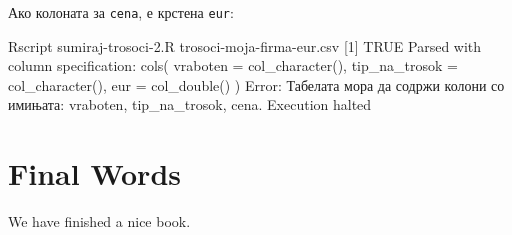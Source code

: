 \documentclass[
]{book}
\newenvironment{Shaded}{\begin{snugshade}}{\end{snugshade}}
\newcommand{\ExtensionTok}[1]{#1}
\newcommand{\NormalTok}[1]{#1}
\newcommand{\StringTok}[1]{\textcolor[rgb]{0.31,0.60,0.02}{#1}}
\begin{document}
Ако колоната за \texttt{cena}, е крстена \texttt{eur}:

\begin{Shaded}
\begin{Highlighting}[]
\ExtensionTok{Rscript}\NormalTok{ sumiraj{-}trosoci{-}2.R trosoci{-}moja{-}firma{-}eur.csv}
\NormalTok{[}\ExtensionTok{1}\NormalTok{] TRUE}
\ExtensionTok{Parsed}\NormalTok{ with column specification:}
\ExtensionTok{cols}\NormalTok{(}
  \ExtensionTok{vraboten}\NormalTok{ = col\_character(),}
  \ExtensionTok{tip\_na\_trosok}\NormalTok{ = col\_character(),}
  \ExtensionTok{eur}\NormalTok{ = col\_double()}
\NormalTok{)}
\ExtensionTok{Error}\NormalTok{: Табелата мора да содржи колони со имињата: }\StringTok{\textquotesingle{}vraboten\textquotesingle{}}\NormalTok{, }\StringTok{\textquotesingle{}tip\_na\_trosok\textquotesingle{}}\NormalTok{, }\StringTok{\textquotesingle{}cena\textquotesingle{}}\NormalTok{.}
\ExtensionTok{Execution}\NormalTok{ halted}
\end{Highlighting}
\end{Shaded}

\hypertarget{final-words}{%
\chapter{Final Words}\label{final-words}}

We have finished a nice book.

  
\end{document}
